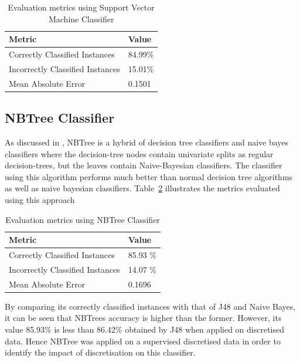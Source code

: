 \documentclass[11pt]{article}
\begin{document}
\begin{table}[h]
 \begin{center}
\begin{tabular}{|l|l|}

	\hline
     Metric & Value  \\
     \hline\hline
     Correctly Classified Instances & 84.99\% \\
	 Incorrectly Classified Instances & 15.01\% \\
	 Mean Absolute Error& 0.1501 \\
     \hline
     
 \end{tabular}
\caption{Evaluation metrics using Support Vector Machine Classifier}\label{table-4}
 \end{center}
\end{table}

\subsection{NBTree Classifier}
As discussed in , NBTree is a hybrid of decision tree classifiers and naive bayes classifiers where the decision-tree nodes contain univariate splits as regular decision-trees, but the leaves contain Naive-Bayesian classifiers. The classifier using this algorithm performs much better than normal decision tree algorithms as well as naive bayesian classifiers. Table~\ref{table-5} illustrates the metrics evaluated using this approach

\begin{table}[h]
 \begin{center}
\begin{tabular}{|l|l|}

	\hline
     Metric & Value  \\
     \hline\hline
     Correctly Classified Instances & 85.93 \% \\
	 Incorrectly Classified Instances & 14.07 \% \\
	 Mean Absolute Error&  0.1696 \\
     \hline
     
 \end{tabular}
\caption{Evaluation metrics using NBTree Classifier}\label{table-5}
 \end{center}
\end{table}

By comparing its correctly classified instances with that of J48 and Naive Bayes, it can be seen that NBTrees accuracy is higher than the former. However, its value 85.93\% is less than 86.42\% obtained by J48 when applied on discretised data. Hence NBTree was applied on a supervised discretised data in order to identify the impact of discretisation on this classifier.  
\end{document}

